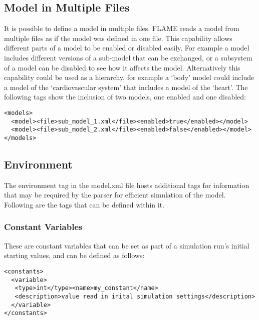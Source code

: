 \subsection{Model in Multiple Files}

It is possible to define a model in multiple files. FLAME reads a model from
multiple files as if the model was defined in one file. This capability allows
different parts of a model to be enabled or disabled easily. For example a
model includes different versions of a sub-model that can be exchanged, or a
subsystem of a model can be disabled to see how it affects the model.
Alternatively this capability could be used as a hierarchy, for example a `body'
model could include a model of the `cardiovascular system' that includes a
model of the `heart'. The following tags show the inclusion of two models, one
enabled and one disabled:

\begin{mylisting}
\begin{verbatim}
<models>
  <model><file>sub_model_1.xml</file><enabled>true</enabled></model>
  <model><file>sub_model_2.xml</file><enabled>false</enabled></model>
</models>
\end{verbatim}
\end{mylisting}

\subsection{Environment}

The environment tag in the model.xml file hosts additional tags for information
that may be required by the parser for efficient simulation of the model.
Following are the tags that can be defined within it.

\subsubsection{Constant Variables}

These are constant variables that can be set as part of a simulation run's
initial starting values, and can be defined as follows:

\begin{mylisting}
\begin{verbatim}
<constants>
  <variable>
   <type>int</type><name>my_constant</name>
   <description>value read in inital simulation settings</description>
  </variable>
</constants>
\end{verbatim}
\end{mylisting}

